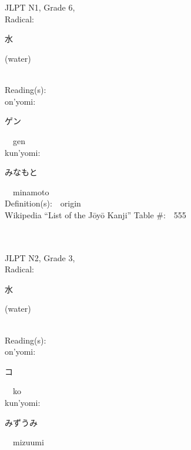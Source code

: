 \begin{multicols}{2}
\ \ \\
{\fontsize{34pt}{40pt}  }\ \ \\  %
{JLPT N1, Grade 6, \\Radical:\ \ {\begin{CJK}{UTF8}{min} 水 \end{CJK}} (water) } \\
Reading(s):\ \ \\
{\hspace*{1em}}on'yomi:\ \ \\
{\hspace*{2em}}{\begin{CJK}{UTF8}{min} ゲン \end{CJK}}\ \ gen\ \ \\
{\hspace*{1em}}kun'yomi:\ \ \\
{\hspace*{2em}}{\begin{CJK}{UTF8}{min} みなもと \end{CJK}}\ \ minamoto\ \ \\
Definition(s):\ \ origin \\
Wikipedia ``List of the J\=oy\=o Kanji'' Table \#:\ \ 555 \\
\ \ \\
{\fontsize{34pt}{40pt}  }\ \ \\  %
{JLPT N2, Grade 3, \\Radical:\ \ {\begin{CJK}{UTF8}{min} 水 \end{CJK}} (water) } \\
Reading(s):\ \ \\
{\hspace*{1em}}on'yomi:\ \ \\
{\hspace*{2em}}{\begin{CJK}{UTF8}{min} コ \end{CJK}}\ \ ko\ \ \\
{\hspace*{1em}}kun'yomi:\ \ \\
{\hspace*{2em}}{\begin{CJK}{UTF8}{min} みずうみ \end{CJK}}\ \ mizuumi\ \ \\

\end{multicols}
